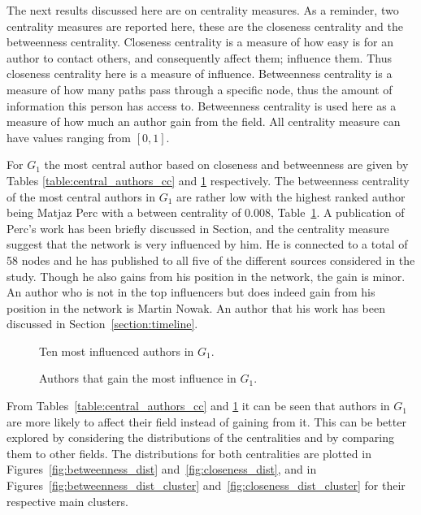 \documentclass{article}
\theoremstyle{definition}
\begin{document}
\newpage

The next results discussed here are on centrality measures. As a reminder,
two centrality measures are reported here, these are the closeness centrality
and the betweenness centrality. Closeness centrality is a measure of how
easy is for an author to contact others, and consequently affect them; influence them.
Thus closeness centrality here is a measure of influence. Betweenness centrality
is a measure of how many paths pass through a specific node, thus the amount
of information this person has access to. Betweenness centrality is used here
as a measure of how much an author gain from the field. All centrality measure
can have values ranging from \([0, 1]\).

For \(G_1\)
the most central author based on closeness and betweenness are given by Tables
\ref{table:central_authors_cc} and \ref{table:central_authors} respectively.
The betweenness centrality of the
most central authors in \(G_1\) are rather low with the highest ranked author
being Matjaz Perc with a between centrality of 0.008, Table~\ref{table:central_authors}.
A publication of Perc's work has been briefly discussed in
Section, and the centrality measure suggest that the network is very influenced by him.
He is connected to a total of 58 nodes and he has published to all five of the different
sources considered in the study. Though he also gains from his position
in the network, the gain is minor. An author who is not in the top influencers but
does indeed gain from his position in the network is Martin Nowak. An author
that his work has been discussed in Section~\ref{section:timeline}.

\begin{figure}[!hbtp]
    \centering
    \begin{minipage}{.45\textwidth}
        \centering
        
        \caption{Ten most influenced authors in \(G_1\).}\label{table:central_authors_cc}
    \end{minipage}%
    \begin{minipage}{.45\textwidth}
        \centering
        
        \caption{Authors that gain the most influence in \(G_1\).}\label{table:central_authors}
    \end{minipage}
\end{figure}


From Tables~\ref{table:central_authors_cc} and \ref{table:central_authors} it
can be seen that authors in \(G_1\) are more likely to affect their field instead
of gaining from it. This can be better explored by considering the distributions
of the centralities and by comparing them to other fields.
The distributions for both centralities are
plotted in Figures~\ref{fig:betweenness_dist} and~\ref{fig:closeness_dist}, and
in Figures~\ref{fig:betweenness_dist_cluster} and~\ref{fig:closeness_dist_cluster}
for their respective main clusters.
\end{document}
